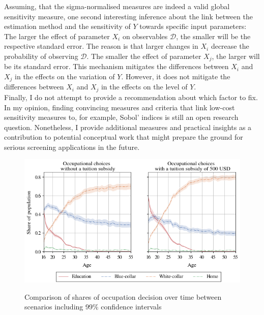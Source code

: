\documentclass[a4paper,12pt]{article}
\begin{document}
\noindent
Assuming, that the sigma-normalised measures are indeed a valid global sensitivity measure, one second interesting inference about the link between the estimation method and the sensitivity of $Y$ towards specific input parameters: The larger the effect of parameter $X_i$ on observables $\pmb{\mathcal{D}}$, the smaller will be the respective standard error. The reason is that larger changes in $X_i$ decrease the probability of observing $\pmb{\mathcal{D}}$. The smaller the effect of parameter $X_j$, the larger will be its standard error. This mechanism mitigates the differences between $X_i$ and $X_j$ in the effects on the variation of $Y$. However, it does not mitigate the differences between $X_i$ and $X_j$ in the effects on the level of $Y$.\\
\noindent
Finally, I do not attempt to provide a recommendation about which factor to fix. In my opinion, finding convincing measures and criteria that link low-cost sensitivity measures to, for example, Sobol' indices is still an open research question. Nonetheless, I provide additional measures and practical insights as a contribution to potential conceptual work that might prepare the ground for serious screening applications in the future.


\begin{figure}[H]
	\caption{Comparison of shares of occupation decision over time between scenarios including 99$\%$ confidence intervals}
	\centering
	\includegraphics[scale=0.75]{../../../scrypy/figures/cone_plot_choice_shares}
	\label{fig:uq_paths}
\end{figure}
\end{document}
